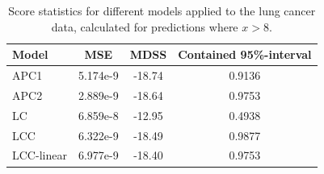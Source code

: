 \begin{table}[h!]
    \begin{center}
        \begin{tabular}{l |c c c }
            Model & MSE &   MDSS & Contained 95\%-interval\\
            \hline
            APC1    & 5.174e-9 & -18.74    & 0.9136 \\
            APC2    & 2.889e-9 & -18.64    & 0.9753 \\
            LC         & 6.859e-8 & -12.95    & 0.4938 \\
            LCC        & 6.322e-9 & -18.49    & 0.9877 \\
            LCC-linear & 6.977e-9 & -18.40    & 0.9753 \\
        \end{tabular}
        \caption{Score statistics for different models applied to the lung cancer data, calculated for predictions where $x > 8$.}\label{tbl:uv-lung-8}
    \end{center}
\end{table}


